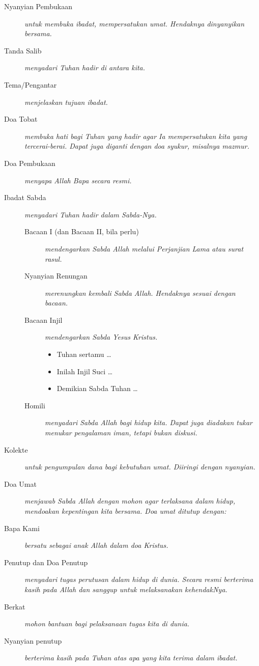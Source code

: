 \documentclass[a5paper,titlepage,11pt]{book}
\begin{document}
\begin{description}
\item [Nyanyian Pembukaan]
      {\it untuk membuka ibadat, mempersatukan umat.  Hendaknya dinyanyikan bersama.}
\item [Tanda Salib]
		{\it menyadari Tuhan hadir di antara kita.}
\item [Tema/Pengantar]
		{\it menjelaskan tujuan ibadat.}	
		
\item [Doa Tobat]
		{\it membuka hati bagi Tuhan yang hadir agar Ia mempersatukan kita yang tercerai-berai. Dapat juga diganti dengan doa syukur, misalnya mazmur.}
		
\item [Doa Pembukaan]
		{\it menyapa Allah Bapa secara resmi.}
		
\item [Ibadat Sabda]
		{\it menyadari Tuhan hadir dalam Sabda-Nya.}
		\begin{description}
		\item [Bacaan I (dan Bacaan II, bila perlu)]
				{\it mendengarkan Sabda Allah melalui Perjanjian Lama atau surat rasul.}
		\item [Nyanyian Renungan]
				{\it merenungkan kembali Sabda Allah. Hendaknya sesuai dengan bacaan.}
		\item [Bacaan Injil]
				{\it mendengarkan Sabda Yesus Kristus.
				\begin{itemize}
				\item Tuhan sertamu \dots
				\item Inilah Injil Suci \dots
				\item Demikian Sabda Tuhan \dots
				\end{itemize}
				}
		\item [Homili]
				{\it menyadari Sabda Allah bagi hidup kita. Dapat juga diadakan tukar menukar pengalaman iman, tetapi bukan diskusi.}
		\end{description}				

\item [Kolekte]
		{\it untuk pengumpulan dana bagi kebutuhan umat. Diiringi dengan nyanyian.}
\item [Doa Umat]
		{\it menjawab Sabda Allah dengan mohon agar terlaksana dalam hidup, mendoakan kepentingan kita bersama. Doa umat ditutup dengan:}
\item [Bapa Kami]
		{\it bersatu sebagai anak Allah dalam doa Kristus.}
\item [Penutup dan Doa Penutup]
		{\it menyadari tugas perutusan dalam hidup di dunia. Secara resmi berterima kasih pada Allah dan sanggup untuk melaksanakan kehendakNya.}
\item [Berkat]
		{\it mohon bantuan bagi pelaksanaan tugas kita di dunia.}
\item [Nyanyian penutup]				
		{\it berterima kasih pada Tuhan atas apa yang kita terima dalam ibadat.}
\end{description}%
\end{document}

